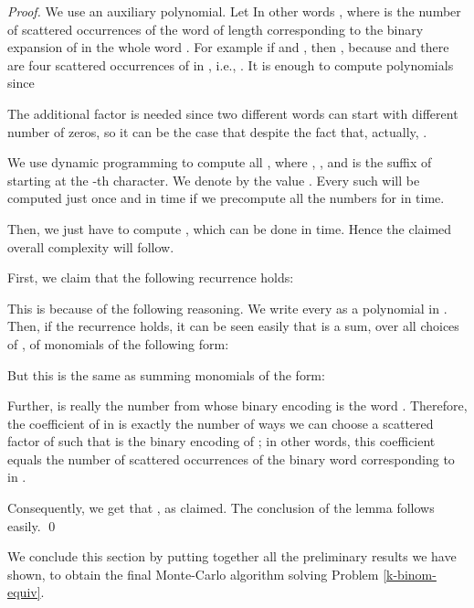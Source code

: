 \documentclass[runningheads]{llncs}
\begin{document}
\begin{proof}
We use an auxiliary polynomial. Let 
In other words  , where  is the number of
scattered occurrences of the word of length  corresponding to the binary expansion of  in the whole word .
For example if  and ,
then , because  and there are four scattered occurrences of  in , i.e., .
It is enough to compute polynomials  since

The additional factor  is needed
since two different words  can start with different number of zeros,
so it can be the case that  despite the fact that, actually, .

We use dynamic programming to compute all , where , , and  is the suffix of  starting at
the -th character. We denote by  the value . Every such  will be computed just once and in time  if we precompute all the numbers  for  in  time.

Then, we just have to compute , which can be done in  time. Hence the claimed overall complexity will follow. 

First, we claim that the following recurrence holds:



This is because of the following reasoning. We write every  as a polynomial in . Then, if the recurrence holds, it can be seen easily that
 is a sum, over all choices of , of monomials of the following form:
 
But this is the same as summing monomials of the form:

Further,  is really the number from  whose binary encoding is the word . 
Therefore, the coefficient of  in  is exactly the number of ways we can choose a scattered factor  of  such that  is the binary encoding of ; in other words, this coefficient equals the number of scattered occurrences of the binary word corresponding to  in .

Consequently, we get that , as claimed. The conclusion of the lemma follows easily.
\qed \end{proof}

We conclude this section by putting together all the preliminary results we have shown, to obtain the final Monte-Carlo algorithm solving Problem \ref{k-binom-equiv}.
\end{document}
